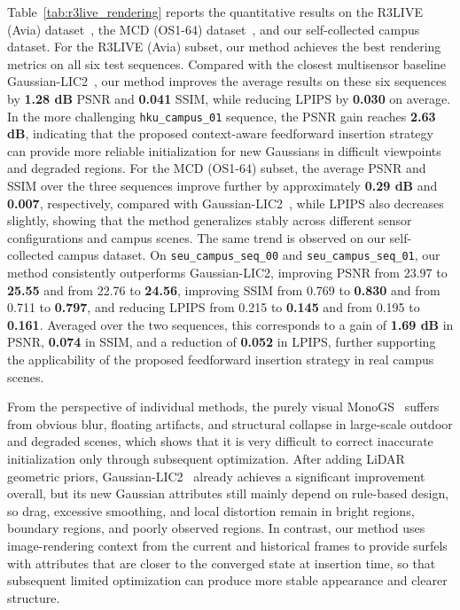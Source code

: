 \documentclass[lettersize,journal]{IEEEtran}
\begin{document}
Table~\ref{tab:r3live_rendering} reports the quantitative results on the R3LIVE (Avia) dataset~\cite{lin2022r}, the MCD (OS1-64) dataset~\cite{nguyen2024mcd}, and our self-collected campus dataset. For the R3LIVE (Avia) subset, our method achieves the best rendering metrics on all six test sequences. Compared with the closest multisensor baseline Gaussian-LIC2~\cite{lang2025gaussianlic2}, our method improves the average results on these six sequences by \textbf{1.28 dB} PSNR and \textbf{0.041} SSIM, while reducing LPIPS by \textbf{0.030} on average. In the more challenging \texttt{hku\_campus\_01} sequence, the PSNR gain reaches \textbf{2.63 dB}, indicating that the proposed context-aware feedforward insertion strategy can provide more reliable initialization for new Gaussians in difficult viewpoints and degraded regions. For the MCD (OS1-64) subset, the average PSNR and SSIM over the three sequences improve further by approximately \textbf{0.29 dB} and \textbf{0.007}, respectively, compared with Gaussian-LIC2~\cite{lang2025gaussianlic2}, while LPIPS also decreases slightly, showing that the method generalizes stably across different sensor configurations and campus scenes. The same trend is observed on our self-collected campus dataset. On \texttt{seu\_campus\_seq\_00} and \texttt{seu\_campus\_seq\_01}, our method consistently outperforms Gaussian-LIC2, improving PSNR from 23.97 to \textbf{25.55} and from 22.76 to \textbf{24.56}, improving SSIM from 0.769 to \textbf{0.830} and from 0.711 to \textbf{0.797}, and reducing LPIPS from 0.215 to \textbf{0.145} and from 0.195 to \textbf{0.161}. Averaged over the two sequences, this corresponds to a gain of \textbf{1.69 dB} in PSNR, \textbf{0.074} in SSIM, and a reduction of \textbf{0.052} in LPIPS, further supporting the applicability of the proposed feedforward insertion strategy in real campus scenes.

From the perspective of individual methods, the purely visual MonoGS~\cite{matsuki2024gaussian} suffers from obvious blur, floating artifacts, and structural collapse in large-scale outdoor and degraded scenes, which shows that it is very difficult to correct inaccurate initialization only through subsequent optimization. After adding LiDAR geometric priors, Gaussian-LIC2~\cite{lang2025gaussianlic2} already achieves a significant improvement overall, but its new Gaussian attributes still mainly depend on rule-based design, so drag, excessive smoothing, and local distortion remain in bright regions, boundary regions, and poorly observed regions. In contrast, our method uses image-rendering context from the current and historical frames to provide surfels with attributes that are closer to the converged state at insertion time, so that subsequent limited optimization can produce more stable appearance and clearer structure.
\end{document}
